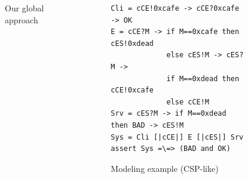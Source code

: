\documentclass{beamer}
\begin{document}
\begin{frame}[fragile]{}
\begin{tcolorbox}[adjusted title={\centering\large Smart-Fuzzing of Industrial Systems}]
\begin{columns}[T]
\begin{column}{.35\textwidth}
\begin{tcolorbox}
                \end{tcolorbox}
            \end{column}
            \begin{column}{.65\textwidth}
                \begin{tcolorbox}[
                colback=white, %
                colframe=normalTitleBlockColor, %
                colframe=gray!20, %
                boxrule=1mm,
                coltext=black, %
                coltitle=black, %
                bottom=2mm,
                equal height group=C,
                valign = center,
                adjusted title={\large Approach}]
                    \begin{columns}[T]
                        \begin{column}{.5\textwidth}
                            \begin{figure}[htb]
                                \vspace{1.5em}
                                \resizebox{.95\columnwidth}{!}{
                                    
                                }
                                \vspace{-.25em}
                                \caption{Our global approach}
                            \end{figure}
                        \end{column}
                        \begin{column}{.5\textwidth}
                            \vspace{.5em}
                            \begin{figure}[htb]
\begin{lstlisting}
Cli = cCE!0xcafe -> cCE?0xcafe -> OK
E = cCE?M -> if M==0xcafe then cES!0xdead
             else cES!M -> cES?M ->
             if M==0xdead then cCE!0xcafe
             else cCE!M
Srv = cES?M -> if M==0xdead then BAD -> cES!M
Sys = Cli [|cCE|] E [|cES|] Srv
assert Sys =\=> (BAD and OK)
\end{lstlisting}
                                \caption{Modeling example (CSP-like)}
                            \end{figure}
                            \vspace{.5em}
                            \begin{figure}[htb]
                                \resizebox{.95\columnwidth}{!}{
}
\end{figure}
\end{column}
\end{columns}
\end{tcolorbox}
\end{column}
\end{columns}
\end{tcolorbox}
\end{frame}
\end{document}
